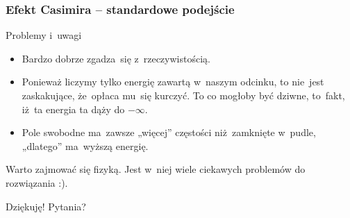 \documentclass[10pt,t]{beamer}
\begin{document}
\begin{frame}
  \frametitle{Efekt Casimira -- standardowe podejście}


  Problemy i~uwagi
  \begin{itemize}

  \item Bardzo dobrze zgadza~się z~rzeczywistością.

  \item Ponieważ liczymy tylko energię zawartą w~naszym odcinku,
    to nie~jest zaskakujące, że~opłaca mu~się kurczyć. To co mogłoby
    być dziwne, to~fakt, iż~ta energia ta dąży do $-\infty$.

  \item Pole swobodne ma~zawsze „więcej” częstości niż~zamknięte
    w~pudle, „dlatego” ma~wyższą energię.

  \end{itemize}

\end{frame}










\appendix





\begin{frame}[standout]


  { \color{jFrametitleFGColor} Warto zajmować się fizyką. Jest w~niej
    wiele ciekawych problemów do rozwiązania :). }

  \vspace{3em}



  { \Large \color{jFrametitleFGColor} Dziękuję! Pytania? }

\end{frame}
\end{document}
